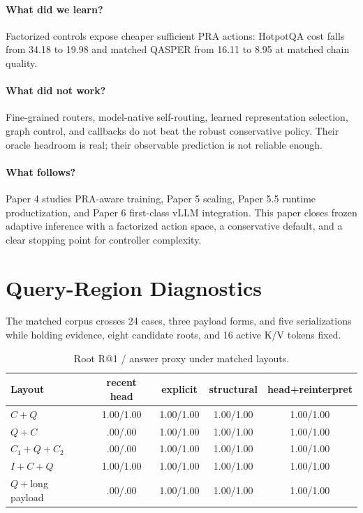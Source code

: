 \documentclass[11pt]{article}
\begin{document}
\paragraph{What did we learn?}
Factorized controls expose cheaper sufficient PRA actions: HotpotQA cost falls from 34.18 to 19.98
and matched QASPER from 16.11 to 8.95 at matched chain quality.

\paragraph{What did not work?}
Fine-grained routers, model-native self-routing, learned representation selection, graph control,
and callbacks do not beat the robust conservative policy. Their oracle headroom is real; their
observable prediction is not reliable enough.

\paragraph{What follows?}
Paper 4 studies PRA-aware training, Paper 5 scaling, Paper 5.5 runtime productization, and Paper 6
first-class vLLM integration. This paper closes frozen adaptive inference with a factorized action
space, a conservative default, and a clear stopping point for controller complexity.

\appendix

\section{Query-Region Diagnostics}
\label{app:query-regions}

The matched corpus crosses 24 cases, three payload forms, and five serializations while holding
evidence, eight candidate roots, and 16 active K/V tokens fixed.

\begin{table}[H]
\centering
\scriptsize
\caption{Root R@1 / answer proxy under matched layouts.}
\begin{tabular}{lcccc}
\toprule
Layout & recent head & explicit & structural & head+reinterpret\\
\midrule
$C+Q$ & 1.00/1.00 & 1.00/1.00 & 1.00/1.00 & 1.00/1.00\\
$Q+C$ & .00/.00 & 1.00/1.00 & 1.00/1.00 & 1.00/1.00\\
$C_1+Q+C_2$ & .00/.00 & 1.00/1.00 & 1.00/1.00 & 1.00/1.00\\
$I+C+Q$ & 1.00/1.00 & 1.00/1.00 & 1.00/1.00 & 1.00/1.00\\
$Q+$long payload & .00/.00 & 1.00/1.00 & 1.00/1.00 & 1.00/1.00\\
\bottomrule
\end{tabular}
\end{table}
\end{document}
